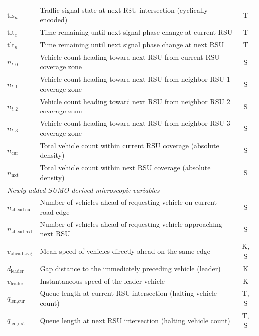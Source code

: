 \documentclass[journal]{IEEEtran}
\begin{document}
\begin{table}[!t]
\begin{tabular}{@{}lp{5.0cm}c@{}}
    $\text{tls}_{n}$          & Traffic signal state at next RSU intersection (cyclically encoded)           & T \\
    $\text{tlt}_{c}$          & Time remaining until next signal phase change at current RSU                 & T \\
    $\text{tlt}_{n}$          & Time remaining until next signal phase change at next RSU                    & T \\
    $n_{t,0}$                 & Vehicle count heading toward next RSU from current RSU coverage zone         & S \\
    $n_{t,1}$                 & Vehicle count heading toward next RSU from neighbor RSU 1 coverage zone      & S \\
    $n_{t,2}$                 & Vehicle count heading toward next RSU from neighbor RSU 2 coverage zone      & S \\
    $n_{t,3}$                 & Vehicle count heading toward next RSU from neighbor RSU 3 coverage zone      & S \\
    $n_{\text{cur}}$          & Total vehicle count within current RSU coverage (absolute density)           & S \\
    $n_{\text{nxt}}$          & Total vehicle count within next RSU coverage (absolute density)              & S \\
    \midrule
    \multicolumn{3}{l}{\textit{Newly added SUMO-derived microscopic variables}} \\
    $n_{\text{ahead,cur}}$    & Number of vehicles ahead of requesting vehicle on current road edge          & S \\
    $n_{\text{ahead,nxt}}$    & Number of vehicles ahead of requesting vehicle approaching next RSU          & S \\
    $v_{\text{ahead,avg}}$    & Mean speed of vehicles directly ahead on the same edge                       & K, S \\
    $d_{\text{leader}}$       & Gap distance to the immediately preceding vehicle (leader)                   & K \\
    $v_{\text{leader}}$       & Instantaneous speed of the leader vehicle                                    & K \\
    $q_{\text{len,cur}}$      & Queue length at current RSU intersection (halting vehicle count)             & T, S \\
    $q_{\text{len,nxt}}$      & Queue length at next RSU intersection (halting vehicle count)                & T, S \\

\end{tabular}
\end{table}
\end{document}
